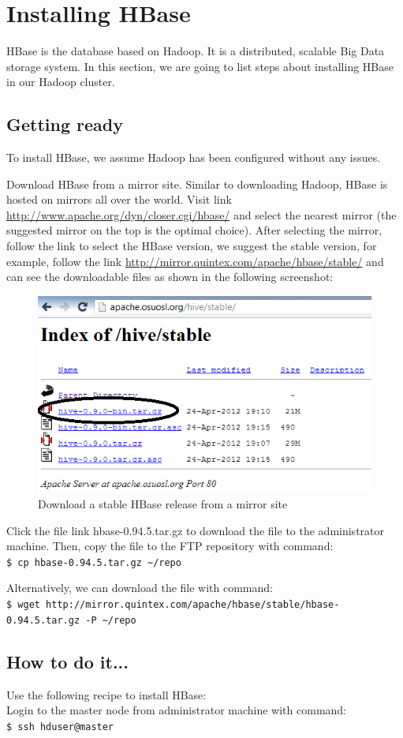 \section{Installing HBase}
HBase is the database based on Hadoop. It is a distributed, scalable Big Data storage system. In this section, we are going to list steps about installing HBase in our Hadoop cluster.

\subsection*{Getting ready}
To install HBase, we assume Hadoop has been configured without any issues.

Download HBase from a mirror site. Similar to downloading Hadoop, HBase is hosted on mirrors all over the world. Visit link \url{http://www.apache.org/dyn/closer.cgi/hbase/} and select the nearest mirror (the suggested mirror on the top is the optimal choice).  After selecting the mirror, follow the link to select the HBase version, we suggest the stable version, for example, follow the link \url{http://mirror.quintex.com/apache/hbase/stable/} and can see the downloadable files as shown in the following screenshot:
\begin{figure}[h]
  \centering
  \includegraphics[width=.6\textwidth]{figs/5163OS_03_08.png}
  \caption{Download a stable HBase release from a mirror site}\label{fig:hbase.download}
\end{figure} 

Click the file link hbase-0.94.5.tar.gz to download the file to the administrator machine. Then, copy the file to the FTP repository with command: \\
\verb|$ cp hbase-0.94.5.tar.gz ~/repo|

Alternatively, we can download the file with command: \\
\verb|$ wget http://mirror.quintex.com/apache/hbase/stable/hbase-0.94.5.tar.gz -P ~/repo|

\subsection*{How to do it...}
Use the following recipe to install HBase: \\
Login to the master node from administrator machine with command: \\
\verb|$ ssh hduser@master|

